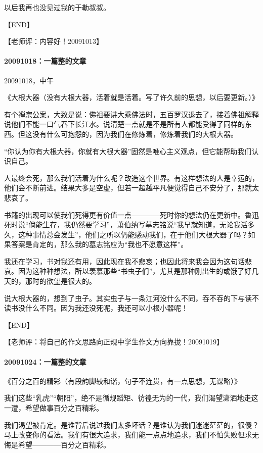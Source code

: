 \documentclass[UTF8]{Diaries}
\begin{document}
以后我再也没见过我的于勒叔叔。

【END】

【老师评：内容好！20091013】


\paragraph{20091018：一篇整的文章}

20091018，中午

《大根大器（没有大根大器，活着就是活着。写了许久前的思想，以后要更新。）》

有个禅宗公案，大致是说：佛祖要讲大乘佛法时，五百罗汉退去了，接着佛祖解释说他们不能一口气吞下长江水。说清楚一点就是不是所有人都能受得了同样的东西。但这没有什么可抱怨的，因为我们在修炼着，修炼着我们的大根大器。

“你认为你有大根大器，你就有大根大器”固然是唯心主义观点，但它能帮助我们认识自己。

人最终会死，那么我们活着为什么呢？改造这个世界。有这样想法的人是幸运的，他们会不断前进。结果大多是空虚，但若一超越平凡便觉得自己不安分了，那就太悲哀了。

书籍的出现可以使我们死得更有价值一点————死时你的想法仍在更新中。鲁迅死时说“倘能生存，我仍然要学习”，萧伯纳写墓志铭说“我早就知道，无论我活多久，这种事情总会发生”，他们之所以仍能感动我们，在于他们大根大器了吗？如果答案是肯定的，那么我的墓志铭应为“我也不愿意这样”。

我还在学习，书对我还有用，因此现在我不悲哀；也因此将来我会因为这句话悲哀。因为这种种想法，所以羡慕那些“书虫子们”，尤其是那种刚出生的或饿了好几天的，那时的欲望是很大的。

说大根大器的，想到了虫子。其实虫子与一条江河没什么不同，吞不吞的下与读不读书没什么不同。因为我还没死呢，我还可以小根小器呢！

【END】

【老师评：将自己的作文思路向正规中学生作文方向靠拢！20091019】


\paragraph{20091024：一篇整的文章}

《百分之百的精彩（有段韵脚较和谐，句子不连贯，有一点思想，无谋略）》

我们这些“乳虎”“朝阳”，绝不是循规蹈矩、彷徨无为的一代，我们渴望潇洒地走这一遭，希望做事百分之百精彩。

我们渴望被肯定。是谁背后说过我们太多坏话？是谁认为我们迷迷茫茫的，很傻？马上改变你的看法。我们有很大追求，我们能一点点地追求，我们不怕失败但求无悔是希望————百分之百精彩。
\end{document}
